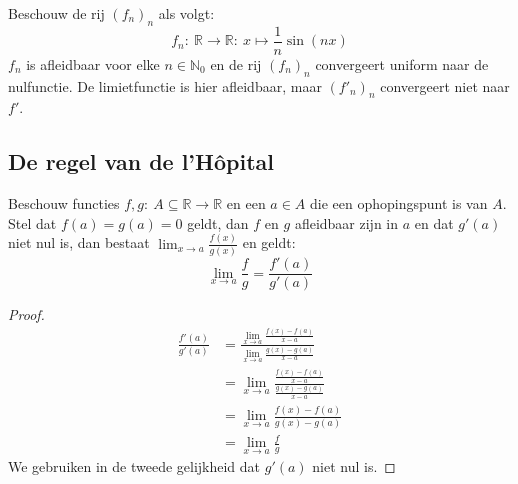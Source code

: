 \documentclass[main.tex]{subfiles}
\begin{document}
\begin{tvb}
  Beschouw de rij $(f_{n})_{n}$ als volgt:
  \[ f_{n}:\ \mathbb{R} \rightarrow \mathbb{R}:\ x \mapsto \frac{1}{n}\sin(nx) \]
  $f_{n}$ is afleidbaar voor elke $n\in \mathbb{N}_{0}$ en de rij $(f_{n})_{n}$ convergeert uniform naar de nulfunctie.
  De limietfunctie is hier afleidbaar, maar $(f'_{n})_{n}$ convergeert niet naar $f'$.
\end{tvb}


\subsection{De regel van de l'H\^opital}
\label{sec:de-regel-van-de-hopital}

\begin{bpr}
  Beschouw functies $f,g:\ A \subseteq \mathbb{R} \rightarrow \mathbb{R}$ en een $a\in A$ die een ophopingspunt is van $A$.
  Stel dat $f(a)=g(a)=0$ geldt, dan $f$ en $g$ afleidbaar zijn in $a$ en dat $g'(a)$ niet nul is, dan bestaat $\lim_{x \rightarrow a}\frac{f(x)}{g(x)}$ en geldt:
  \[ \lim_{x\rightarrow a}\frac{f}{g}= \frac{f'(a)}{g'(a)} \]

  \begin{proof}
    \[
    \begin{array}{rl}
      \frac{f'(a)}{g'(a)}
      &= \frac{\lim_{x\rightarrow a}\frac{f(x)-f(a)}{x-a}}{\lim_{x\rightarrow a}\frac{g(x)-g(a)}{x-a}}\\
      &= \lim_{x\rightarrow a}\frac{\frac{f(x)-f(a)}{x-a}}{\frac{g(x)-g(a)}{x-a}}\\
      &= \lim_{x\rightarrow a}\frac{f(x)-f(a)}{g(x)-g(a)}\\
      &= \lim_{x\rightarrow a}\frac{f}{g}
    \end{array}
    \]
    We gebruiken in de tweede gelijkheid dat $g'(a)$ niet nul is.
  \end{proof}
\end{bpr}
\end{document}
